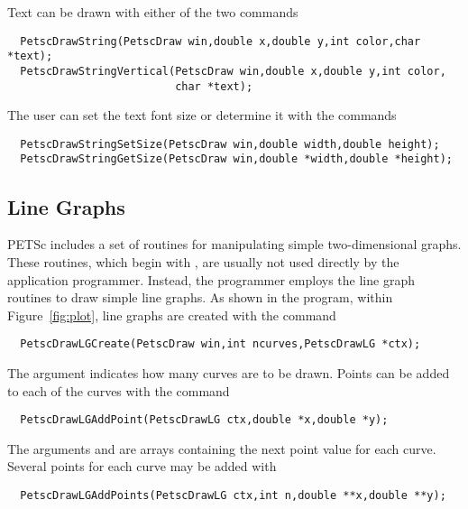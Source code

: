 Text can be drawn with either of the two 
commands  
\begin{verbatim}
  PetscDrawString(PetscDraw win,double x,double y,int color,char *text);
  PetscDrawStringVertical(PetscDraw win,double x,double y,int color,
                          char *text);
\end{verbatim}
The user can set the text font size or determine it with the 
commands  
\begin{verbatim}
  PetscDrawStringSetSize(PetscDraw win,double width,double height);
  PetscDrawStringGetSize(PetscDraw win,double *width,double *height);
\end{verbatim}

\subsection{Line Graphs}
PETSc includes a set of routines for manipulating simple two-dimensional
graphs. These routines, which begin with , are usually 
not used directly by the application programmer.  Instead, the programmer 
employs the line graph routines to draw simple line graphs.
As shown in the program, within Figure~\ref{fig:plot}, line graphs 
are created with the command  
\begin{verbatim}
  PetscDrawLGCreate(PetscDraw win,int ncurves,PetscDrawLG *ctx);
\end{verbatim}
The argument  indicates how many curves are to be drawn.
Points can be added to each of the curves with the 
command 
\begin{verbatim}
  PetscDrawLGAddPoint(PetscDrawLG ctx,double *x,double *y);
\end{verbatim}
The arguments  and  are arrays containing the next 
point value for each curve.
Several points for each curve may be added with 
\begin{verbatim}
  PetscDrawLGAddPoints(PetscDrawLG ctx,int n,double **x,double **y);
\end{verbatim}

